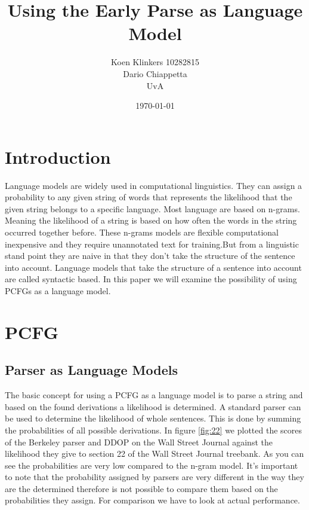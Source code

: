\documentclass[11pt,a4paper]{article}
\begin{document}
\title{Using the Early Parse as Language Model}
\author{Koen Klinkers 10282815\\Dario Chiappetta\\UvA}
\date{\today}

\maketitle


\section{Introduction}
Language models are widely used in computational linguistics. They can assign a probability to any given string of words that represents the likelihood that the given string belongs to a specific language.  Most language are based on n-grams. Meaning the likelihood of a string is based on how often the words in the string occurred together before. These n-grams models are flexible computational inexpensive and they require unannotated text for training.But from a linguistic stand point they are naive in that they don't take the structure of the sentence into account. Language models that take the structure of a sentence into account are called syntactic based. In this paper we will examine the possibility of using PCFGs as a language model.

\section{PCFG}
\subsection{Parser as Language Models}
The basic concept for using a PCFG as a language model is to parse a string and based on the found derivations a likelihood is determined. A standard parser can be used to determine the likelihood of whole sentences. This is done by summing the probabilities of all possible derivations.  In figure \ref{fig:22} we plotted the scores of the Berkeley parser and DDOP on the Wall Street Journal against the likelihood they give to section 22 of the Wall Street Journal treebank.  As you can see the probabilities are very low compared to the n-gram model. It's important to note that the probability assigned by parsers are very different in the way they are the determined therefore is not possible to compare them based on the probabilities they assign. For comparison we have to look at actual performance.
\end{document}
